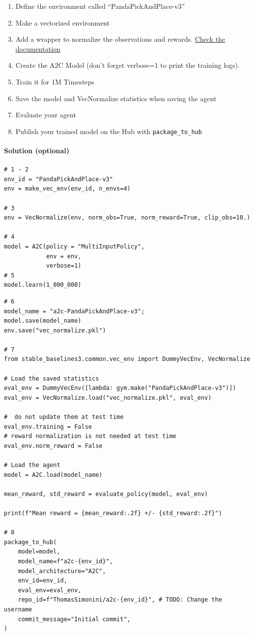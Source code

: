 \documentclass[11pt,a4paper]{article}
\begin{document}
\begin{enumerate}
\def\labelenumi{\arabic{enumi}.}
\tightlist
\item
  Define the environment called ``PandaPickAndPlace-v3''
\item
  Make a vectorized environment
\item
  Add a wrapper to normalize the observations and rewards. \href{https://stable-baselines3.readthedocs.io/en/master/guide/vec_envs.html\#vecnormalize}{Check the documentation}
\item
  Create the A2C Model (don't forget verbose=1 to print the training logs).
\item
  Train it for 1M Timesteps
\item
  Save the model and VecNormalize statistics when saving the agent
\item
  Evaluate your agent
\item
  Publish your trained model on the Hub with \texttt{package\_to\_hub}
\end{enumerate}

\paragraph{Solution (optional)}\label{solution-optional}

\begin{lstlisting}
# 1 - 2
env_id = "PandaPickAndPlace-v3"
env = make_vec_env(env_id, n_envs=4)

# 3
env = VecNormalize(env, norm_obs=True, norm_reward=True, clip_obs=10.)

# 4
model = A2C(policy = "MultiInputPolicy",
            env = env,
            verbose=1)
# 5
model.learn(1_000_000)
\end{lstlisting}

\begin{lstlisting}
# 6
model_name = "a2c-PandaPickAndPlace-v3";
model.save(model_name)
env.save("vec_normalize.pkl")

# 7
from stable_baselines3.common.vec_env import DummyVecEnv, VecNormalize

# Load the saved statistics
eval_env = DummyVecEnv([lambda: gym.make("PandaPickAndPlace-v3")])
eval_env = VecNormalize.load("vec_normalize.pkl", eval_env)

#  do not update them at test time
eval_env.training = False
# reward normalization is not needed at test time
eval_env.norm_reward = False

# Load the agent
model = A2C.load(model_name)

mean_reward, std_reward = evaluate_policy(model, eval_env)

print(f"Mean reward = {mean_reward:.2f} +/- {std_reward:.2f}")

# 8
package_to_hub(
    model=model,
    model_name=f"a2c-{env_id}",
    model_architecture="A2C",
    env_id=env_id,
    eval_env=eval_env,
    repo_id=f"ThomasSimonini/a2c-{env_id}", # TODO: Change the username
    commit_message="Initial commit",
)
\end{lstlisting}
\end{document}
